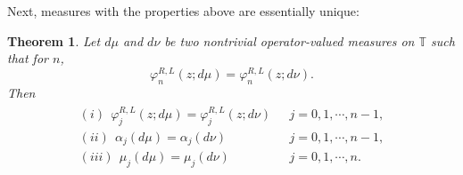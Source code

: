 \documentclass[11pt]{article}
\newtheorem{theorem}{Theorem}[section]
\begin{document}
\noindent Next, measures with the properties above are essentially unique:
\begin{theorem} \label{geronimus_thm}
    Let $d\mu$ and $d\nu$ be two nontrivial operator-valued measures on $\mathbb{T}$ such that for $n$, 
    \begin{equation}\label{eq:Phi_N}
           \varphi_{n}^{R,L}(z;d\mu) = \varphi_{n}^{R,L}(z;d\nu).
    \end{equation} 
Then 
    \begin{eqnarray} \label{eq:Geronimus_op}
    	\begin{array}{ll}
            (i)~~\varphi^{R,L}_{j}(z;d\mu) = \varphi_{j}^{R,L}(z;d\nu)& \mbox{   $j=0,1,\cdots,n-1$} , \\
            (ii)~~\alpha_{j}(d\mu) = \alpha_{j}(d\nu)  & \mbox{   $j=0,1,\cdots,n-1$},\\
            (iii)~~\mu_{j}(d\mu) = \mu_{j}(d\nu)  & \mbox{  $j=0,1,\cdots,n$}.\\
            \end{array}  
    \end{eqnarray} 
\end{theorem}
\end{document}
